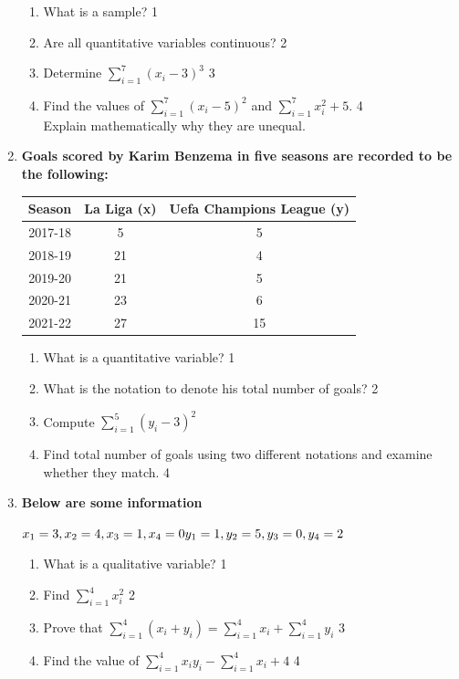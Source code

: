\documentclass[a4paper,oneside]{book}
\begin{document}
\begin{enumerate}
  \begin{enumerate}
    \item
	What is a sample? \hfill 1
    \item
    	Are all quantitative variables continuous?  \hfill 2
    \item
    	Determine $\displaystyle \sum_{i=1}^7 (x_i-3)^3$ \hfill 3
     \item
     	Find the values of  $\displaystyle \sum_{i=1}^7 (x_i-5)^2$ and $\displaystyle \sum_{i=1}^7 x_i^2+5.$  \hfill 4 \\
     	Explain mathematically why they are unequal.
  \end{enumerate}
  
   \item
	  \textbf{Goals scored by Karim Benzema in five seasons are recorded to be the following:} 
	  
	  \begin{table}[h]
	  \centering
\begin{tabular}{c|c|c}
Season & La Liga (x) & Uefa Champions League (y) \\ \hline
2017-18 & 5 & 5 \\ 
2018-19 & 21 & 4 \\
2019-20 & 21 & 5 \\
2020-21 & 23 & 6 \\ 
2021-22 & 27 & 15 \\ \hline
\end{tabular}
\end{table}
  
  \begin{enumerate}
    \item
	What is a quantitative variable? \hfill 1
    \item
	What is the notation to denote his total number of goals? \hfill 2
    \item  
	Compute $\displaystyle \sum_{i=1}^5 (y_i - 3)^2$ \hfill 
    \item
	Find total number of goals using two different notations and examine whether they match. \hfill 4
  \end{enumerate}

  
 \item
	  \textbf{Below are some information} 
  
  $x_1=3, x_2=4, x_3=1, x_4=0 \\
	  y_1=1, y_2=5, y_3=0, y_4=2$
  
  \begin{enumerate}
    \item
	What is a qualitative variable? \hfill 1
    \item
	Find $\displaystyle \sum_{i=1}^{4}x_i^2$ \hfill 2
    \item  
	Prove that $\displaystyle \sum_{i=1}^{4} (x_i+y_i) = \sum_{i=1}^{4}x_i + \sum_{i=1}^{4}y_i $ \hfill 3
    \item
	Find the value of $\displaystyle \sum_{i=1}^{4} x_iy_i-\sum_{i=1}^{4} x_i+4$ \hfill 4


\end{enumerate}
\end{enumerate}
\end{document}

